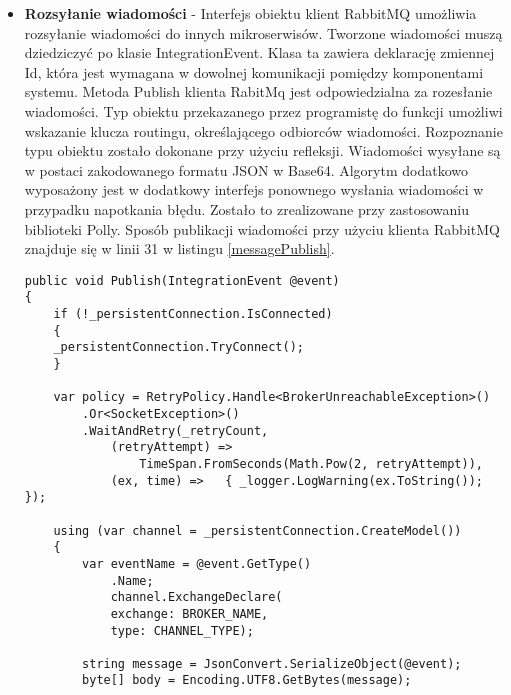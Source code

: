 \begin{itemize}
\begin{lstlisting}[caption=Akcja zapisu zdjęcia.]
[HttpPost("")]
public async Task<IActionResult> Create(IFormFile file)
{
	if (file == null)
	{
		return BadRequest();
	}
	var userId = int.Parse(_userManager.GetUserId(User));
	var result = await _photoService.Create(file, userId);
	await _photoService.SaveChanges();
	
	var integrationEvent = 
		_mapper.Map<ImageClasificationEvent>(result);
	_eventBus.Publish(integrationEvent);
	
	return Ok(new { id = result.Id });
}
\end{lstlisting} 

\item \textbf{Rozsyłanie wiadomości} - Interfejs obiektu klient RabbitMQ umożliwia  rozsyłanie wiadomości do innych mikroserwisów. Tworzone wiadomości muszą dziedziczyć po klasie IntegrationEvent. Klasa ta zawiera deklarację zmiennej Id, która jest wymagana w dowolnej komunikacji pomiędzy komponentami systemu. Metoda Publish klienta RabitMq jest odpowiedzialna za rozesłanie wiadomości. Typ obiektu przekazanego przez programistę do funkcji umożliwi wskazanie klucza routingu, określającego odbiorców wiadomości. Rozpoznanie typu obiektu zostało dokonane przy użyciu refleksji. Wiadomości wysyłane są w postaci zakodowanego formatu JSON w Base64. Algorytm dodatkowo wyposażony jest w dodatkowy interfejs ponownego wysłania wiadomości w przypadku napotkania błędu. Zostało to zrealizowane przy zastosowaniu biblioteki Polly. Sposób publikacji wiadomości przy użyciu klienta RabbitMQ znajduje się w linii 31 w listingu \ref{messagePublish}. 
\newpage

\begin{lstlisting}[caption={Metoda publikacji wiadomości.}, label={messagePublish}]
public void Publish(IntegrationEvent @event)
{
	if (!_persistentConnection.IsConnected)
	{
	_persistentConnection.TryConnect();
	}

	var policy = RetryPolicy.Handle<BrokerUnreachableException>()
		.Or<SocketException>()
		.WaitAndRetry(_retryCount, 
			(retryAttempt) => 
				TimeSpan.FromSeconds(Math.Pow(2, retryAttempt)), 
			(ex, time) =>	{ _logger.LogWarning(ex.ToString()); });

	using (var channel = _persistentConnection.CreateModel())
	{
		var eventName = @event.GetType()
			.Name;
			channel.ExchangeDeclare(
			exchange: BROKER_NAME,
			type: CHANNEL_TYPE);                
	
		string message = JsonConvert.SerializeObject(@event);
		byte[] body = Encoding.UTF8.GetBytes(message);
	

\end{lstlisting}
\end{itemize}
